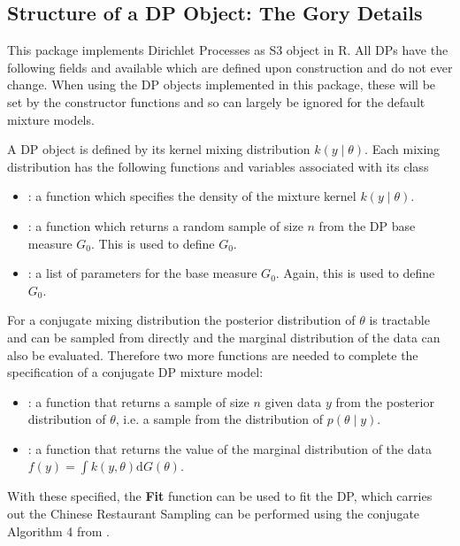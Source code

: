 \documentclass[nojss]{jss}
\begin{document}
\subsection{Structure of a DP Object: The Gory Details}
This package implements Dirichlet Processes as S3 object in R. All DPs have the following fields and available which are defined upon construction and do not ever change. When using the DP objects implemented in this package, these will be set by the constructor functions and so can largely be ignored for the default mixture models.

A DP object is defined by its kernel mixing distribution $k(y \mid \theta)$. Each mixing distribution has the following functions and variables associated with its class
\begin{itemize}
\item {}: a function which specifies the density of the mixture kernel $k(y \mid \theta)$.
\item {}: a function which returns a random sample of size $n$ from the DP base measure $G_0$. This is used to define $G_0$.
\item {}: a list of parameters for the base measure $G_0$. Again, this is used to define $G_0$.
\end{itemize}

For a conjugate mixing distribution the posterior distribution of $\theta$ is tractable and can be sampled from directly and the marginal distribution of the data can also be evaluated. Therefore two more functions are needed to complete the specification of a conjugate DP mixture model:
\begin{itemize}
\item {}: a function that returns a sample of size $n$ given data $y$ from the posterior distribution of $\theta$, i.e. a sample from the distribution of $p(\theta \mid y)$.
\item {}: a function that returns the value of the marginal distribution of the data $f(y) = \int k(y , \theta) \mathrm{d} G(\theta)$.
\end{itemize}

With these specified, the \textbf{Fit} function can be used to fit the DP, which carries out the Chinese Restaurant Sampling can be performed using the conjugate Algorithm 4 from \citep{neal_markov_2000}.
\end{document}
